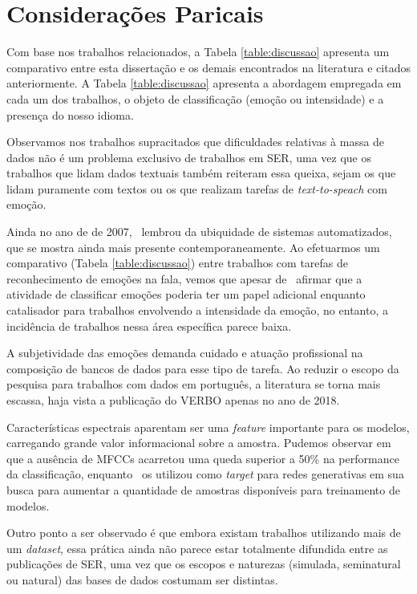 
\section{Considerações Paricais}

Com base nos trabalhos relacionados, a Tabela \ref{table:discussao} apresenta um comparativo entre esta dissertação e os demais encontrados na literatura e citados anteriormente. A Tabela \ref{table:discussao} apresenta a abordagem empregada em cada um dos trabalhos, o objeto de classificação (emoção ou intensidade) e a presença do nosso idioma.

Observamos nos trabalhos supracitados que dificuldades relativas à massa de dados não é um problema exclusivo de trabalhos em \acrshort{SER}, uma vez que os trabalhos que lidam dados textuais também reiteram essa queixa, sejam os que lidam puramente com textos ou os que realizam tarefas de \textit{text-to-speach} com emoção.

Ainda no ano de de 2007,~\cite{32.32} lembrou da ubiquidade de sistemas automatizados, que se mostra ainda mais presente contemporaneamente. Ao efetuarmos um comparativo (Tabela \ref{table:discussao}) entre trabalhos com tarefas de reconhecimento de emoções na fala, vemos que apesar de~\cite{14} afirmar que a atividade de classificar emoções poderia ter um papel adicional enquanto catalisador para trabalhos envolvendo a intensidade da emoção, no entanto, a incidência de trabalhos nessa área específica parece baixa.

A subjetividade das emoções demanda cuidado e atuação profissional na composição de bancos de dados para esse tipo de tarefa. Ao reduzir o escopo da pesquisa para trabalhos com dados em português, a literatura se torna mais escassa, haja vista a publicação do VERBO apenas no ano de 2018.

Características espectrais aparentam ser uma \textit{feature} importante para os modelos, carregando grande valor informacional sobre a amostra. Pudemos observar em~\cite{11} que a ausência de \acrshort{MFCC}s acarretou uma queda superior a 50\% na performance da classificação, enquanto~\cite{34} os utilizou como \textit{target} para redes generativas em sua busca para aumentar a quantidade de amostras disponíveis para treinamento de modelos.

Outro ponto a ser observado é que embora existam trabalhos utilizando mais de um \textit{dataset}, essa prática ainda não parece estar totalmente difundida entre as publicações de \acrshort{SER}, uma vez que os escopos e naturezas (simulada, seminatural ou natural) das bases de dados costumam ser distintas.

